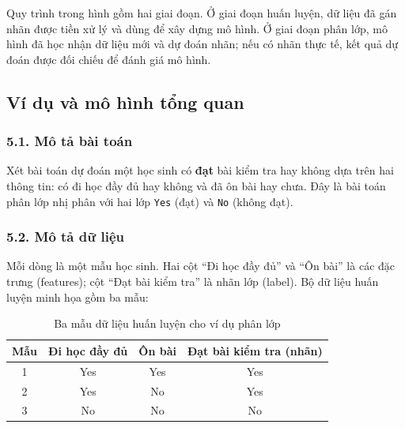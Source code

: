 Quy trình trong hình gồm hai giai đoạn. Ở giai đoạn huấn luyện, dữ liệu đã gán nhãn được tiền xử lý và dùng để xây dựng mô hình. Ở giai đoạn phân lớp, mô hình đã học nhận dữ liệu mới và dự đoán nhãn; nếu có nhãn thực tế, kết quả dự đoán được đối chiếu để đánh giá mô hình.

\subsection{Ví dụ và mô hình tổng quan}
\subsubsection*{5.1. Mô tả bài toán}
Xét bài toán dự đoán một học sinh có \textbf{đạt} bài kiểm tra hay không dựa trên hai thông tin: có đi học đầy đủ hay không và đã ôn bài hay chưa. Đây là bài toán phân lớp nhị phân với hai lớp \texttt{Yes} (đạt) và \texttt{No} (không đạt).

\subsubsection*{5.2. Mô tả dữ liệu}
Mỗi dòng là một mẫu học sinh. Hai cột ``Đi học đầy đủ'' và ``Ôn bài'' là các đặc trưng (features); cột ``Đạt bài kiểm tra'' là nhãn lớp (label). Bộ dữ liệu huấn luyện minh họa gồm ba mẫu:

\begin{table}[H]
    \centering
    \renewcommand{\arraystretch}{1.2}
    \begin{tabular}{|c|c|c|c|}
        \hline
        \textbf{Mẫu} & \textbf{Đi học đầy đủ} & \textbf{Ôn bài} & \textbf{Đạt bài kiểm tra (nhãn)} \\
        \hline
        1 & Yes & Yes & Yes \\
        \hline
        2 & Yes & No  & Yes \\
        \hline
        3 & No  & No  & No \\
        \hline
    \end{tabular}
    \caption{Ba mẫu dữ liệu huấn luyện cho ví dụ phân lớp}
    \label{tab:classification-simple-example}
\end{table}

